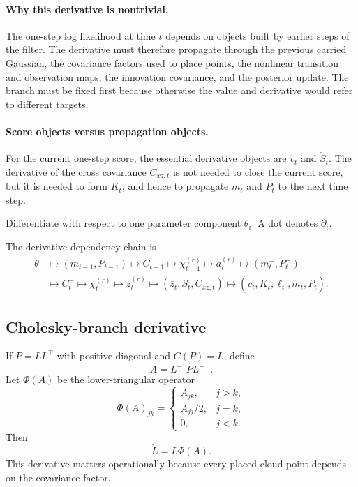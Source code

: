 \documentclass[11pt]{article}
\numberwithin{equation}{section}
\newcommand{\ellhat}{\widehat\ell}
\begin{document}
\paragraph{Why this derivative is nontrivial.}
The one-step log likelihood at time \(t\) depends on objects built by earlier
steps of the filter.  The derivative must therefore propagate through the
previous carried Gaussian, the covariance factors used to place points, the
nonlinear transition and observation maps, the innovation covariance, and the
posterior update.  The branch must be fixed first because otherwise the value and
derivative would refer to different targets.

\paragraph{Score objects versus propagation objects.}
For the current one-step score, the essential derivative objects are
\(\dot v_t\) and \(\dot S_t\).  The derivative of the cross covariance
\(\dot C_{xz,t}\) is not needed to close the current score, but it is needed to
form \(\dot K_t\), and hence to propagate \(\dot m_t\) and \(\dot P_t\) to the
next time step.

Differentiate with respect to one parameter component \(\theta_i\).  A dot
denotes \(\partial_i\).

The derivative dependency chain is
\begin{equation}
\begin{aligned}
  \theta
  &\longmapsto (m_{t-1},P_{t-1})
  \longmapsto C_{t-1}
  \longmapsto \chi_{t-1}^{(r)}
  \longmapsto a_t^{(r)}
  \longmapsto (m_t^-,P_t^-) \\
  &\longmapsto C_t^-
  \longmapsto \chi_t^{(r)}
  \longmapsto z_t^{(r)}
  \longmapsto (\bar z_t,S_t,C_{xz,t})
  \longmapsto (v_t,K_t,\ellhat_t,m_t,P_t).
\end{aligned}
\label{eq:gradient-chain}
\end{equation}

\subsection{Cholesky-branch derivative}
\label{subsec:chol-derivative}

If \(P=LL^\top\) with positive diagonal and \(C(P)=L\), define
\begin{equation}
  A = L^{-1}\dot P L^{-\top}.
  \label{eq:chol-A}
\end{equation}
Let \(\Phi(A)\) be the lower-triangular operator
\begin{equation}
  \Phi(A)_{jk}
  =
  \begin{cases}
    A_{jk}, & j>k,\\
    A_{jj}/2, & j=k,\\
    0, & j<k.
  \end{cases}
  \label{eq:chol-Phi}
\end{equation}
Then
\begin{equation}
  \dot L = L\Phi(A).
  \label{eq:chol-derivative}
\end{equation}
This derivative matters operationally because every placed cloud point depends on
the covariance factor.
\end{document}
